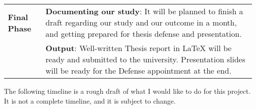 \begin{tabular}{|l|p{12cm}|}
    \hline
    \textbf{Final Phase} & \textbf{Documenting our study}: It will be planned to finish a draft regarding our study and our outcome in a month, and getting prepared for thesis defense and presentation.                                                                                                                                                                                                                                                                                          \\
                         & \textbf{Output}: Well-written Thesis report in LaTeX will be ready and submitted to the university. Presentation slides will be ready for the Defense appointment at the end.                                                                                                                                                                                                                                                                                           \\
    \hline
\end{tabular}

\newpage

The following timeline is a rough draft of what I would like to do for this project. It is not a complete timeline, and it is subject to change.

